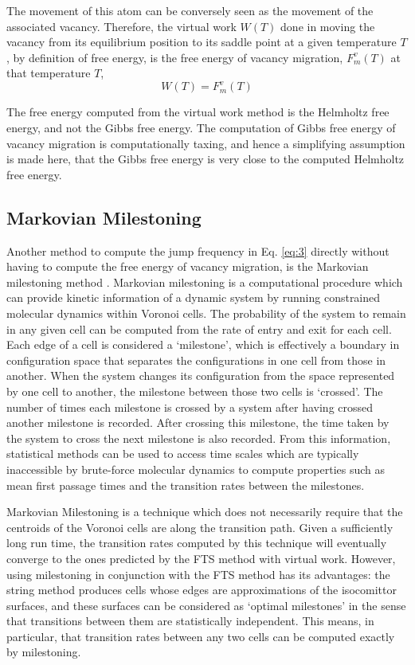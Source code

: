 \documentclass{article}
\begin{document}
The movement of this atom can be conversely seen as the movement of the associated vacancy. Therefore, the virtual work $W(T)$ done in moving the vacancy from its equilibrium position to its saddle point at a given temperature $T$, by definition of free energy, is the free energy of vacancy migration, $F_{m}^{v}(T)$ at that temperature $T$,
%
\begin{equation} \label{eq:35}
W(T) = F_{m}^{v}(T)
\end{equation}
% 

\noindent The free energy computed from the virtual work method is the Helmholtz free energy, and not the Gibbs free energy. The computation of Gibbs free energy of vacancy migration is computationally taxing, and hence a simplifying assumption is made here, that the Gibbs free energy is very close to the computed Helmholtz free energy.

\subsection{Markovian Milestoning} \label{mile}

Another method to compute the jump frequency in Eq. \ref{eq:3} directly without having to compute the free energy of vacancy migration, is the Markovian milestoning method \cite{Vanden-Eijnden2009a}. Markovian milestoning is a computational procedure which can provide kinetic information of a dynamic system by running constrained molecular dynamics within Voronoi cells. The probability of the system to remain in any given cell can be computed from the rate of entry and exit for each cell. Each edge of a cell is considered a \enquote*{milestone}, which is effectively a boundary in configuration space that separates the configurations in one cell from those in another. When the system changes its configuration from the space represented by one cell to another, the milestone between those two cells is \enquote*{crossed}. The number of times each milestone is crossed by a system after having crossed another milestone is recorded. After crossing this milestone, the time taken by the system to cross the next milestone is also recorded. From this information, statistical methods can be used to access time scales which are typically inaccessible by brute-force molecular dynamics to compute properties such as mean first passage times and the transition rates between the milestones. 

Markovian Milestoning is a technique which does not necessarily require that the centroids of the Voronoi cells are along the transition path. Given a sufficiently long run time, the transition rates computed by this technique will eventually converge to the ones predicted by the FTS method with virtual work. However, using milestoning in conjunction with the FTS method has its advantages: the string method produces cells whose edges are approximations of the isocomittor surfaces, and these surfaces can be considered as \enquote*{optimal milestones} in the sense that transitions between them are statistically independent. This means, in particular, that transition rates between any two cells can be computed exactly by milestoning.
\end{document}
